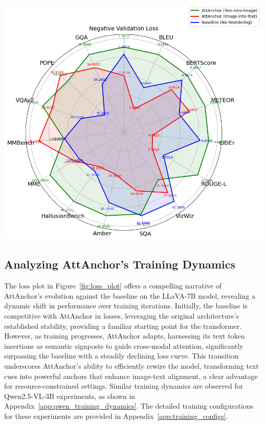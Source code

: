 \documentclass[11pt]{article}
\begin{document}
\begin{minipage}[t]{0.48\textwidth}
    \centering
    
    \label{fig:radarcos}
    \vspace{0.5em}
    \includegraphics[width=1.2\linewidth]{compare3.png}
\end{minipage}










\subsection{Analyzing AttAnchor's Training Dynamics}

The loss plot in Figure~\ref{fig:loss_plot} offers a compelling narrative of AttAnchor's evolution against the baseline on the LLaVA-7B model, revealing a dynamic shift in performance over training iterations. Initially, the baseline is competitive with AttAnchor in losses, leveraging the original architecture's established stability, providing a familiar starting point for the transformer. However, as training progresses, AttAnchor adapts, harnessing its text token insertions as semantic signposts to guide cross-modal attention, significantly surpassing the baseline with a steadily declining loss curve. This transition underscores AttAnchor's ability to efficiently rewire the model, transforming text cues into powerful anchors that enhance image-text alignment, a clear advantage for resource-constrained settings. Similar training dynamics are observed for Qwen2.5-VL-3B experiments, as shown in Appendix~\ref{app:qwen_training_dynamics}. The detailed training configurations for these experiments are provided in Appendix~\ref{app:training_configs}.
\end{document}
